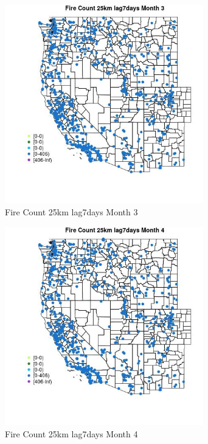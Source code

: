 \begin{figure} 
\centering  
\includegraphics[width=0.77\textwidth]{Code_Outputs/Report_ML_input_PM25_Step4_part_f_de_duplicated_aveswNAs_MapObsMo3Fire_Count_25km_lag7days.jpg} 
\caption{\label{fig:Report_ML_input_PM25_Step4_part_f_de_duplicated_aveswNAsMapObsMo3Fire_Count_25km_lag7days}Fire Count 25km lag7days Month 3} 
\end{figure} 
 

\begin{figure} 
\centering  
\includegraphics[width=0.77\textwidth]{Code_Outputs/Report_ML_input_PM25_Step4_part_f_de_duplicated_aveswNAs_MapObsMo4Fire_Count_25km_lag7days.jpg} 
\caption{\label{fig:Report_ML_input_PM25_Step4_part_f_de_duplicated_aveswNAsMapObsMo4Fire_Count_25km_lag7days}Fire Count 25km lag7days Month 4} 
\end{figure} 
 

